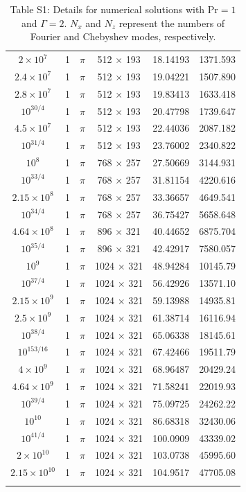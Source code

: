 \documentclass[reprint,amsmath,amssymb,aps]{revtex4-1}
\newcommand\Pran{\mathrm{Pr}}
\begin{document}
\begin{longtable*}{cccccc}
    $2\times10^{7}$	&	1	&	$\pi$	&	512 $\times$ 193	&	18.14193	&	1371.593\\
    $2.4\times10^{7}$	&	1	&	$\pi$	&	512 $\times$ 193	&	19.04221	&	1507.890\\
    $2.8\times10^{7}$	&	1	&	$\pi$	&	512 $\times$ 193	&	19.83413	&	1633.418\\
    $10^{30/4}$	&	1	&	$\pi$	&	512 $\times$ 193	&	20.47798	&	1739.647\\
    $4.5\times10^{7}$	&	1	&	$\pi$	&	512 $\times$ 193	&	22.44036	&	2087.182\\
    $10^{31/4}$	&	1	&	$\pi$	&	512 $\times$ 193	&	23.76002	&	2340.822\\
    $10^{8}$	&	1	&	$\pi$	&	768 $\times$ 257	&	27.50669	&	3144.931\\
    $10^{33/4}$	&	1	&	$\pi$	&	768 $\times$ 257	&	31.81154	&	4220.616\\
    $2.15\times10^{8}$	&	1	&	$\pi$	&	768 $\times$ 257	&	33.36657	&	4649.541\\
    $10^{34/4}$	&	1	&	$\pi$	&	768 $\times$ 257	&	36.75427	&	5658.648\\
    $4.64\times10^{8}$	&	1	&	$\pi$	&	896 $\times$ 321	&	40.44652	&	6875.704\\
    $10^{35/4}$	&	1	&	$\pi$	&	896 $\times$ 321	&	42.42917	&	7580.057\\
    $10^{9}$	&	1	&	$\pi$	&	1024 $\times$ 321	&	48.94284	&	10145.79\\
    $10^{37/4}$	&	1	&	$\pi$	&	1024 $\times$ 321	&	56.42926	&	13571.10\\
    $2.15\times10^{9}$	&	1	&	$\pi$	&	1024 $\times$ 321	&	59.13988	&	14935.81\\
    $2.5\times10^{9}$	&	1	&	$\pi$	&	1024 $\times$ 321	&	61.38714	&	16116.94\\
    $10^{38/4}$	&	1	&	$\pi$	&	1024 $\times$ 321	&	65.06338	&	18145.61\\
    $10^{153/16}$	&	1	&	$\pi$	&	1024 $\times$ 321	&	67.42466	&	19511.79\\
    $4\times10^{9}$	&	1	&	$\pi$	&	1024 $\times$ 321	&	68.96487	&	20429.24\\
    $4.64\times10^{9}$	&	1	&	$\pi$	&	1024 $\times$ 321	&	71.58241	&	22019.93\\
    $10^{39/4}$	&	1	&	$\pi$	&	1024 $\times$ 321	&	75.09725	&	24262.22\\
    $10^{10}$	&	1	&	$\pi$	&	1024 $\times$ 321	&	86.68318	&	32430.06\\
    $10^{41/4}$	&	1	&	$\pi$	&	1024 $\times$ 321	&	100.0909	&	43339.02\\
    $2\times10^{10}$	&	1	&	$\pi$	&	1024 $\times$ 321	&	103.0738	&	45995.60\\
    $2.15\times10^{10}$ &	1	&	$\pi$	&	1024 $\times$ 321	&	104.9517	&	47705.08\vspace{0.1in}\\
    \caption*{Table S1: Details for numerical solutions with $\Pran=1$ and $\Gamma=2$.  $N_x$ and $N_z$ represent the numbers of Fourier and Chebyshev modes, respectively.}
    {\label{tab:Gamma2}}
    \end{longtable*}


% 

\end{document}
